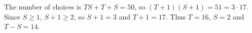 The number of choices is $TS+T+S=50$, so $(T+1)(S+1)=51=3\cdot17$. Since $S\ge1$, $S+1\ge2$, so $S+1=3$ and $T+1=17$. Thus $T=16$, $S=2$ and $T-S=\boxed{14}$.
